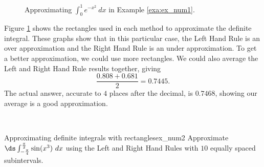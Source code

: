 \begin{solution}
{\begin{figure}
\begin{subfigure}{.5\textwidth}
  
  \caption{}
\end{subfigure}
\caption{Approximating $\int_0^1e^{-x^2}\ dx$ in Example \ref{exa:ex_num1}. \label{fig:num1}}
\end{figure}


Figure \ref{fig:num1} shows the rectangles used in each method to approximate the definite integral. These graphs show that in this particular case, the Left Hand Rule is an over approximation and the Right Hand Rule is an under approximation. To get a better approximation, we could use more rectangles. We could also average the Left and Right Hand Rule results together, giving $$ \frac{0.808 + 0.681}{2} = 0.7445.$$ The actual answer, accurate to $ 4 $ places after the decimal, is $ 0.7468 $, showing our average is a good approximation.
}\\
\end{solution}






\begin{example}{Approximating definite integrals with rectangles}{ex_num2}{
Approximate $\ds\int_{-\frac{\pi}4}^{\frac{\pi}2} \sin (x^3)\ dx$ using the Left and Right Hand Rules with $ 10 $ equally spaced subintervals.}
\end{example}

